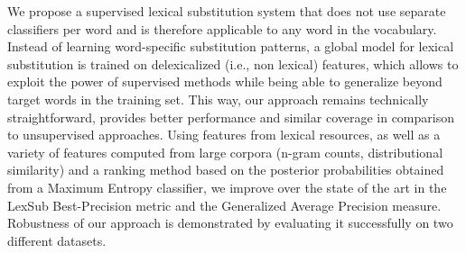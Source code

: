 We propose a supervised lexical substitution system that does not use separate classifiers per word and is therefore applicable to any word in the vocabulary.
 Instead of learning word-specific substitution patterns, a global model for
 lexical substitution is trained on delexicalized (i.e., non lexical) features,
 which allows to exploit the power of supervised methods while being able to
 generalize beyond target words in the training set.
 This way, our approach remains technically straightforward, provides better
 performance and similar coverage in comparison to unsupervised approaches.
 Using features from lexical resources, as well as a variety of features
 computed from large corpora (n-gram counts, distributional similarity) and a
 ranking method based on the posterior probabilities obtained from a Maximum
 Entropy classifier, we improve over the state of the art in the LexSub
 Best-Precision metric and the Generalized Average Precision measure. Robustness
 of our approach is demonstrated by evaluating it successfully on two different
 datasets.

